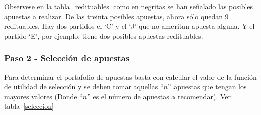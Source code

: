 \begin{table}[ht]
\centering
{}
\caption{Escogiendo apuestas que vale la pena realizar}
\label{redituables}
\end{table}

Observese en la tabla~\ref{redituables} como en negritas se han señalado las posibles apuestas a realizar. De las treinta posibles apuestas, ahora sólo quedan 9 redituables. Hay dos partidos el `C' y el `J' que no ameritan apuesta alguna. Y el partido `E', por ejemplo, tiene dos posibles apuestas redituables.

\subsubsection{Paso 2 - Selección de apuestas}
\label{sec:paso-2}


Para determinar el portafolio de apuestas basta con calcular el valor de la función de utilidad de selección y se deben tomar aquellas ``$n$'' apuestas que tengan los mayores valores (Donde ``$n$'' es el número de apuestas a recomendar).
Ver tabla~\ref{seleccion}

